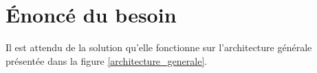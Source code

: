 
\section{Énoncé du besoin}
Il est attendu de la solution qu'elle fonctionne sur l'architecture générale présentée dans la figure \ref{architecture_generale}.
